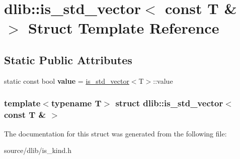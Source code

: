 \hypertarget{structdlib_1_1is__std__vector_3_01const_01T_01_6_01_4}{
\section{dlib::is\_\-std\_\-vector$<$ const T \& $>$ Struct Template Reference}
\label{structdlib_1_1is__std__vector_3_01const_01T_01_6_01_4}
}
\subsection*{Static Public Attributes}
\begin{DoxyCompactItemize}
\item 
\hypertarget{structdlib_1_1is__std__vector_3_01const_01T_01_6_01_4_a2182542008a9b43fd7705f484d226695}{
static const bool {\bfseries value} = \hyperlink{structdlib_1_1is__std__vector}{is\_\-std\_\-vector}$<$T$>$::value}
\label{structdlib_1_1is__std__vector_3_01const_01T_01_6_01_4_a2182542008a9b43fd7705f484d226695}

\end{DoxyCompactItemize}
\subsubsection*{template$<$typename T$>$ struct dlib::is\_\-std\_\-vector$<$ const T \& $>$}



The documentation for this struct was generated from the following file:\begin{DoxyCompactItemize}
\item 
source/dlib/is\_\-kind.h\end{DoxyCompactItemize}
